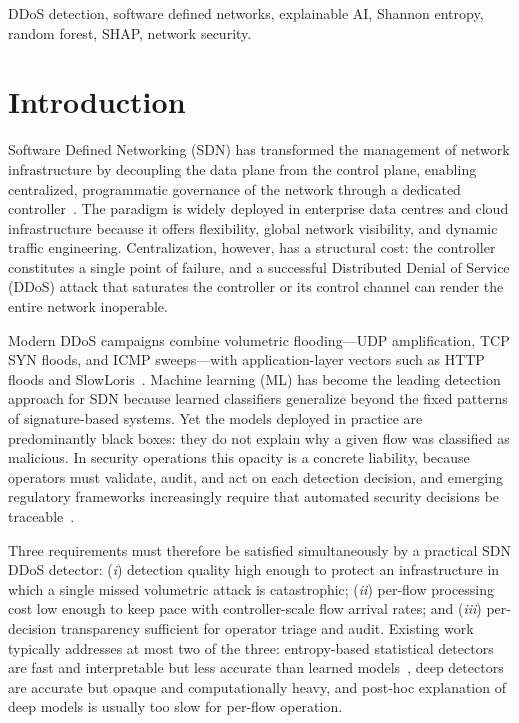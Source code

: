 ﻿\documentclass[journal]{IEEEtran}
\begin{document}
\begin{IEEEkeywords}
DDoS detection, software defined networks, explainable AI, Shannon entropy, random forest, SHAP, network security.
\end{IEEEkeywords}

\section{Introduction}
\label{sec:intro}

Software Defined Networking (SDN) has transformed the management of network infrastructure by decoupling the data plane from the control plane, enabling centralized, programmatic governance of the network through a dedicated controller~\cite{mckeown2008openflow,kreutz2015sdn}. The paradigm is widely deployed in enterprise data centres and cloud infrastructure because it offers flexibility, global network visibility, and dynamic traffic engineering. Centralization, however, has a structural cost: the controller constitutes a single point of failure, and a successful Distributed Denial of Service (DDoS) attack that saturates the controller or its control channel can render the entire network inoperable.

Modern DDoS campaigns combine volumetric flooding---UDP amplification, TCP SYN floods, and ICMP sweeps---with application-layer vectors such as HTTP floods and SlowLoris~\cite{mirkovic2004taxonomy,sharafaldin2019ddos,akarma2026agents}. Machine learning (ML) has become the leading detection approach for SDN because learned classifiers generalize beyond the fixed patterns of signature-based systems. Yet the models deployed in practice are predominantly black boxes: they do not explain why a given flow was classified as malicious. In security operations this opacity is a concrete liability, because operators must validate, audit, and act on each detection decision, and emerging regulatory frameworks increasingly require that automated security decisions be traceable~\cite{toqeer2026climate,jan2025blockchain,arrieta2020xai}.

Three requirements must therefore be satisfied simultaneously by a practical SDN DDoS detector: (\emph{i}) detection quality high enough to protect an infrastructure in which a single missed volumetric attack is catastrophic; (\emph{ii}) per-flow processing cost low enough to keep pace with controller-scale flow arrival rates; and (\emph{iii}) per-decision transparency sufficient for operator triage and audit. Existing work typically addresses at most two of the three: entropy-based statistical detectors are fast and interpretable but less accurate than learned models~\cite{mousavi2015early}, deep detectors are accurate but opaque and computationally heavy, and post-hoc explanation of deep models is usually too slow for per-flow operation.
\end{document}

